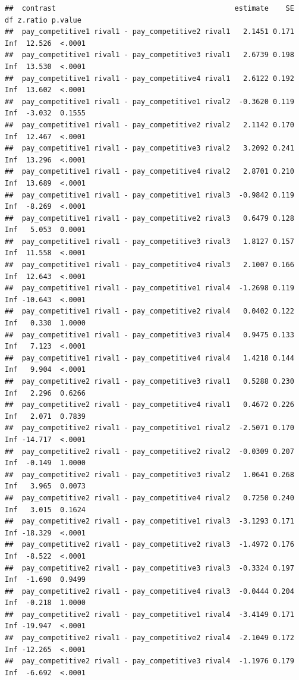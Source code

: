 \documentclass[
]{article}
\begin{document}
\begin{verbatim}
##  contrast                                          estimate    SE  df z.ratio p.value
##  pay_competitive1 rival1 - pay_competitive2 rival1   2.1451 0.171 Inf  12.526  <.0001
##  pay_competitive1 rival1 - pay_competitive3 rival1   2.6739 0.198 Inf  13.530  <.0001
##  pay_competitive1 rival1 - pay_competitive4 rival1   2.6122 0.192 Inf  13.602  <.0001
##  pay_competitive1 rival1 - pay_competitive1 rival2  -0.3620 0.119 Inf  -3.032  0.1555
##  pay_competitive1 rival1 - pay_competitive2 rival2   2.1142 0.170 Inf  12.467  <.0001
##  pay_competitive1 rival1 - pay_competitive3 rival2   3.2092 0.241 Inf  13.296  <.0001
##  pay_competitive1 rival1 - pay_competitive4 rival2   2.8701 0.210 Inf  13.689  <.0001
##  pay_competitive1 rival1 - pay_competitive1 rival3  -0.9842 0.119 Inf  -8.269  <.0001
##  pay_competitive1 rival1 - pay_competitive2 rival3   0.6479 0.128 Inf   5.053  0.0001
##  pay_competitive1 rival1 - pay_competitive3 rival3   1.8127 0.157 Inf  11.558  <.0001
##  pay_competitive1 rival1 - pay_competitive4 rival3   2.1007 0.166 Inf  12.643  <.0001
##  pay_competitive1 rival1 - pay_competitive1 rival4  -1.2698 0.119 Inf -10.643  <.0001
##  pay_competitive1 rival1 - pay_competitive2 rival4   0.0402 0.122 Inf   0.330  1.0000
##  pay_competitive1 rival1 - pay_competitive3 rival4   0.9475 0.133 Inf   7.123  <.0001
##  pay_competitive1 rival1 - pay_competitive4 rival4   1.4218 0.144 Inf   9.904  <.0001
##  pay_competitive2 rival1 - pay_competitive3 rival1   0.5288 0.230 Inf   2.296  0.6266
##  pay_competitive2 rival1 - pay_competitive4 rival1   0.4672 0.226 Inf   2.071  0.7839
##  pay_competitive2 rival1 - pay_competitive1 rival2  -2.5071 0.170 Inf -14.717  <.0001
##  pay_competitive2 rival1 - pay_competitive2 rival2  -0.0309 0.207 Inf  -0.149  1.0000
##  pay_competitive2 rival1 - pay_competitive3 rival2   1.0641 0.268 Inf   3.965  0.0073
##  pay_competitive2 rival1 - pay_competitive4 rival2   0.7250 0.240 Inf   3.015  0.1624
##  pay_competitive2 rival1 - pay_competitive1 rival3  -3.1293 0.171 Inf -18.329  <.0001
##  pay_competitive2 rival1 - pay_competitive2 rival3  -1.4972 0.176 Inf  -8.522  <.0001
##  pay_competitive2 rival1 - pay_competitive3 rival3  -0.3324 0.197 Inf  -1.690  0.9499
##  pay_competitive2 rival1 - pay_competitive4 rival3  -0.0444 0.204 Inf  -0.218  1.0000
##  pay_competitive2 rival1 - pay_competitive1 rival4  -3.4149 0.171 Inf -19.947  <.0001
##  pay_competitive2 rival1 - pay_competitive2 rival4  -2.1049 0.172 Inf -12.265  <.0001
##  pay_competitive2 rival1 - pay_competitive3 rival4  -1.1976 0.179 Inf  -6.692  <.0001

\end{verbatim}
\end{document}
